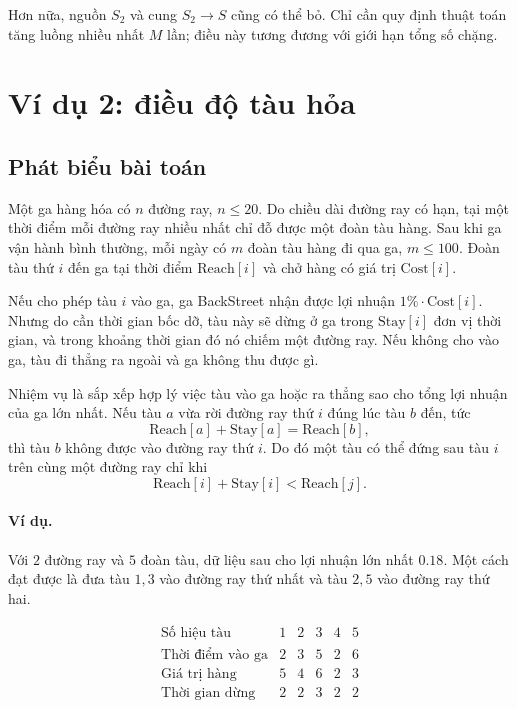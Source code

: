 \documentclass[11pt]{article}
\begin{document}
Hơn nữa, nguồn \(S_2\) và cung \(S_2\to S\) cũng có thể bỏ. Chỉ cần quy định
thuật toán tăng luồng nhiều nhất \(M\) lần; điều này tương đương với giới hạn
tổng số chặng.

\section{Ví dụ 2: điều độ tàu hỏa}

\subsection{Phát biểu bài toán}

Một ga hàng hóa có \(n\) đường ray, \(n\le 20\). Do chiều dài đường ray có
hạn, tại một thời điểm mỗi đường ray nhiều nhất chỉ đỗ được một đoàn tàu
hàng. Sau khi ga vận hành bình thường, mỗi ngày có \(m\) đoàn tàu hàng đi qua
ga, \(m\le 100\). Đoàn tàu thứ \(i\) đến ga tại thời điểm \(\mathrm{Reach}[i]\)
và chở hàng có giá trị \(\mathrm{Cost}[i]\).

Nếu cho phép tàu \(i\) vào ga, ga BackStreet nhận được lợi nhuận
\(1\%\cdot \mathrm{Cost}[i]\). Nhưng do cần thời gian bốc dỡ, tàu này sẽ dừng
ở ga trong \(\mathrm{Stay}[i]\) đơn vị thời gian, và trong khoảng thời gian đó
nó chiếm một đường ray. Nếu không cho vào ga, tàu đi thẳng ra ngoài và ga
không thu được gì.

Nhiệm vụ là sắp xếp hợp lý việc tàu vào ga hoặc ra thẳng sao cho tổng lợi
nhuận của ga lớn nhất. Nếu tàu \(a\) vừa rời đường ray thứ \(i\) đúng lúc
tàu \(b\) đến, tức
\[
  \mathrm{Reach}[a]+\mathrm{Stay}[a]=\mathrm{Reach}[b],
\]
thì tàu \(b\) không được vào đường ray thứ \(i\). Do đó một tàu có thể đứng
sau tàu \(i\) trên cùng một đường ray chỉ khi
\[
  \mathrm{Reach}[i]+\mathrm{Stay}[i]<\mathrm{Reach}[j].
\]

\paragraph{Ví dụ.}
Với \(2\) đường ray và \(5\) đoàn tàu, dữ liệu sau cho lợi nhuận lớn nhất
\(0.18\). Một cách đạt được là đưa tàu \(1,3\) vào đường ray thứ nhất và tàu
\(2,5\) vào đường ray thứ hai.

\[
\begin{array}{c|ccccc}
\text{Số hiệu tàu} & 1 & 2 & 3 & 4 & 5\\ \hline
\text{Thời điểm vào ga} & 2 & 3 & 5 & 2 & 6\\
\text{Giá trị hàng} & 5 & 4 & 6 & 2 & 3\\
\text{Thời gian dừng} & 2 & 2 & 3 & 2 & 2
\end{array}
\]
\end{document}
